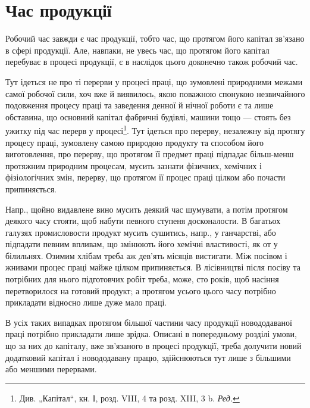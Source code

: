 \section{Час продукції}

Робочий час завжди є час продукції, тобто час, що протягом його
капітал зв’язано в сфері продукції. Але, навпаки, не увесь час, що протягом
його капітал перебуває в процесі продукції, є в наслідок цього
доконечно також робочий час.

Тут ідеться не про ті перерви у процесі праці, що зумовлені природними
межами самої робочої сили, хоч вже й виявилось, якою поважною
спонукою незвичайного подовження процесу праці та заведення
денної й нічної роботи є та лише обставина, що основний капітал
фабричні будівлі, машини тощо — стоять без ужитку під час перерв у процесі\footnote*{
Див. „Капітал“, кн. І, розд. VIII, 4 та розд. XIII, 3 b. \emph{Ред.}
}.
Тут ідеться про перерву, незалежну від протягу процесу праці,
зумовлену самою природою продукту та способом його виготовлення,
про перерву, що протягом її предмет праці підпадає більш-менш протяжним
природним процесам, мусить зазнати фізичних, хемічних і фізіологічних
змін, перерву, що протягом її процес праці цілком або почасти
припиняється.

Напр., щойно видавлене вино мусить деякий час шумувати, а потім
протягом деякого часу стояти, щоб набути певного ступеня досконалости.
В багатьох галузях промисловости продукт мусить сушитись, напр., у
ганчарстві, або підпадати певним впливам, що змінюють його хемічні
властивості, як от у білильнях. Озимим хлібам треба аж дев’ять місяців
вистигати. Між посівом і жнивами процес праці майже цілком припиняється.
В лісівництві після посіву та потрібних для нього підготовчих
робіт треба, може, сто років, щоб насіння перетворилося на готовий продукт;
а протягом усього цього часу потрібно прикладати відносно лише
дуже мало праці.

В усіх таких випадках протягом більшої частини часу продукції новододаваної
праці потрібно прикладати лише зрідка. Описані в попередньому
розділі умови, що за них до капіталу, вже зв’язаного в процесі
продукції, треба долучити новий додатковий капітал і новододавану працю,
здійснюються тут лише з більшими або меншими перервами.

